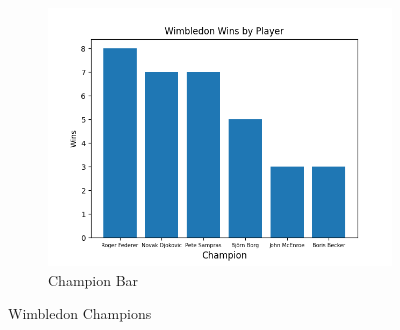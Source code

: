 \documentclass{article}
\begin{document}
\begin{figure}[h]
\begin{subfigure}[b]{0.3\linewidth}
    \includegraphics[width=\linewidth]{PS6c_Rann.png}
    \caption{Champion Bar}
    \label{fig:image3}
  \end{subfigure}
  \caption{Wimbledon Champions}
  \label{fig:threeimages}
\end{figure}
\end{document}
